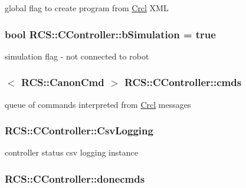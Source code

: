 global flag to create program from \hyperlink{namespaceCrcl}{Crcl} X\-M\-L \hypertarget{structRCS_1_1CController_a5cc727cd1f880d16be6f34d501e06ef0}{
\subsubsection[{b\-Simulation}]{\setlength{\rightskip}{0pt plus 5cm}bool R\-C\-S\-::\-C\-Controller\-::b\-Simulation = true\hspace{0.3cm}{\ttfamily [static]}}}\label{structRCS_1_1CController_a5cc727cd1f880d16be6f34d501e06ef0}
simulation flag -\/ not connected to robot \hypertarget{structRCS_1_1CController_adceba05ebd7fa94f93c131db84840d29}{
\subsubsection[{cmds}]{$<$ {\bf R\-C\-S\-::\-Canon\-Cmd} $>$ R\-C\-S\-::\-C\-Controller\-::cmds\hspace{0.3cm}{\ttfamily [static]}}}\label{structRCS_1_1CController_adceba05ebd7fa94f93c131db84840d29}
queue of commands interpreted from \hyperlink{namespaceCrcl}{Crcl} messages \hypertarget{structRCS_1_1CController_a7e21b1156fe37407bae1ba468815206c}{
\subsubsection[{Csv\-Logging}]{ R\-C\-S\-::\-C\-Controller\-::\-Csv\-Logging\hspace{0.3cm}{\ttfamily [static]}}}\label{structRCS_1_1CController_a7e21b1156fe37407bae1ba468815206c}
controller status csv logging instance \hypertarget{structRCS_1_1CController_a093ccebe77526dc736b0ddff70dec0fc}{
\subsubsection[{donecmds}]{ R\-C\-S\-::\-C\-Controller\-::donecmds\hspace{0.3cm}{\ttfamily [static]}}}\label{structRCS_1_1CController_a093ccebe77526dc736b0ddff70dec0fc}

